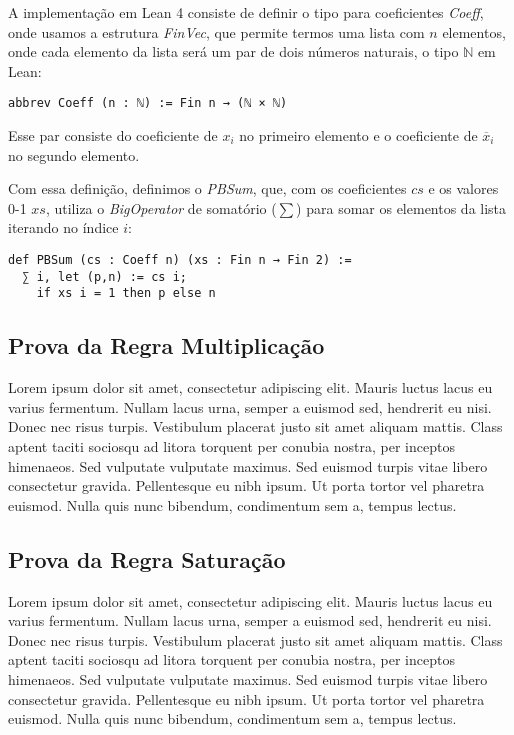 \documentclass[conference]{IEEEtran}
\begin{document}
A implementação em Lean 4 consiste de definir o tipo para coeficientes \textit{Coeff}, onde usamos a estrutura
\textit{FinVec}, que permite termos uma lista com $n$ elementos, onde cada elemento da lista será um par
de dois números naturais, o tipo $\mathbb{N}$ em Lean:
\begin{verbatim}
abbrev Coeff (n : ℕ) := Fin n → (ℕ × ℕ)
\end{verbatim}

Esse par consiste do coeficiente de $x_i$ no primeiro elemento e o coeficiente de $\overline x_i$ no segundo elemento.

Com essa definição, definimos o \textit{PBSum}, que, com os coeficientes $cs$ e os valores 0-1 $xs$,
utiliza o \textit{BigOperator} de somatório ($\sum$) para somar os elementos da lista iterando no índice $i$:
\begin{verbatim}
def PBSum (cs : Coeff n) (xs : Fin n → Fin 2) :=
  ∑ i, let (p,n) := cs i;
    if xs i = 1 then p else n
\end{verbatim}


\subsection{Prova da Regra Multiplicação}
Lorem ipsum dolor sit amet, consectetur adipiscing elit. Mauris luctus lacus eu varius fermentum. Nullam lacus urna, semper a euismod sed, hendrerit eu nisi. Donec nec risus turpis. Vestibulum placerat justo sit amet aliquam mattis. Class aptent taciti sociosqu ad litora torquent per conubia nostra, per inceptos himenaeos. Sed vulputate vulputate maximus. Sed euismod turpis vitae libero consectetur gravida. Pellentesque eu nibh ipsum. Ut porta tortor vel pharetra euismod. Nulla quis nunc bibendum, condimentum sem a, tempus lectus.

\subsection{Prova da Regra Saturação}
Lorem ipsum dolor sit amet, consectetur adipiscing elit. Mauris luctus lacus eu varius fermentum. Nullam lacus urna, semper a euismod sed, hendrerit eu nisi. Donec nec risus turpis. Vestibulum placerat justo sit amet aliquam mattis. Class aptent taciti sociosqu ad litora torquent per conubia nostra, per inceptos himenaeos. Sed vulputate vulputate maximus. Sed euismod turpis vitae libero consectetur gravida. Pellentesque eu nibh ipsum. Ut porta tortor vel pharetra euismod. Nulla quis nunc bibendum, condimentum sem a, tempus lectus.
\end{document}
